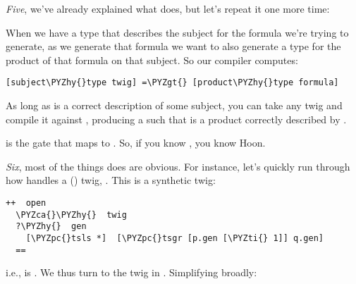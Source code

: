 \emph{Five}, we've already explained what  does, but let's
repeat it one more time:

When we have a type that describes the subject for the formula
we're trying to generate, as we generate that formula we want to
also generate a type for the product of that formula on that
subject.  So our compiler computes:

\begin{framed_shaded}
\begin{Verbatim}[fontsize=\relsize{-2.5},fontseries=b,commandchars=\\\{\}]
[subject\PYZhy{}type twig] =\PYZgt{} [product\PYZhy{}type formula]
\end{Verbatim}
\end{framed_shaded}
As long as  is a correct description of some
subject, you can take any twig and compile it against
, producing a  such that  is a product correctly described by .

 is the gate that maps  to .
So, if you know , you know Hoon.

\emph{Six}, most of the things  does are obvious.  For
instance, let's quickly run through how  handles a
\kode{=+} () twig, \kode{[\%tsls p=twig q=twig]}.  This is a 
synthetic twig:

\begin{framed_shaded}
\begin{Verbatim}[fontsize=\relsize{-2.5},fontseries=b,commandchars=\\\{\}]
++  open
  \PYZca{}\PYZhy{}  twig
  ?\PYZhy{}  gen
    [\PYZpc{}tsls *]  [\PYZpc{}tsgr [p.gen [\PYZti{} 1]] q.gen]
  ==
\end{Verbatim}
\end{framed_shaded}
i.e.,  is .  We thus turn to the 
twig in .  Simplifying broadly:

